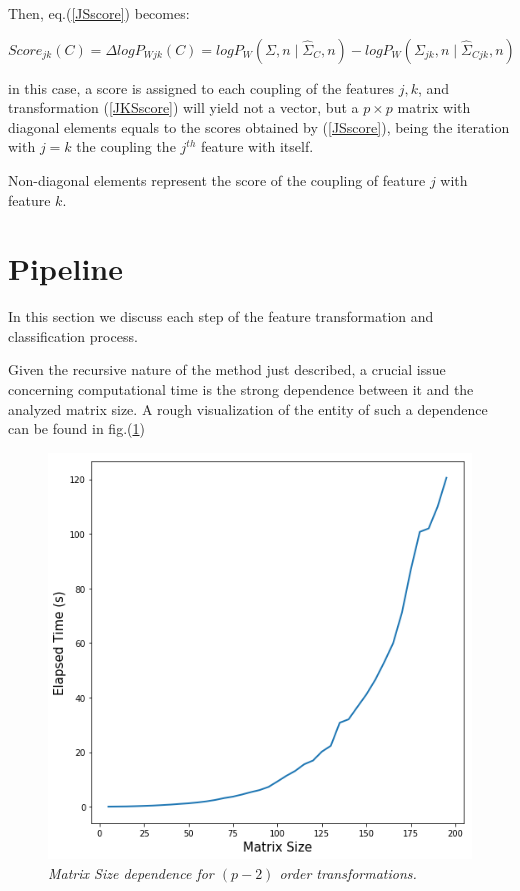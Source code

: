 \documentclass[12pt,openright,twoside,a4paper]{book}
\begin{document}
Then, eq.(\ref{JSscore}) becomes:

\begin{equation}
Score_{jk}(C)=\Delta logP_{Wjk}(C)=logP_W(\Sigma, n \mid \hat{\Sigma}_C,n)-logP_W(\Sigma_{jk}, n \mid \hat{\Sigma}_{Cjk},n)
\label{JKSscore}
\end{equation}
\vspace{5mm}

in this case, a score is assigned to each coupling of the features $j,k$, and transformation (\ref{JKSscore}) will yield not a vector, but a $p\times p$ matrix with diagonal elements equals to the scores obtained by (\ref{JSscore}), being the iteration with $j=k$ the coupling the $j^{th}$ feature with itself. 

Non-diagonal elements represent the score of the coupling of feature $j$ with feature $k$.

\section{Pipeline}

In this section we discuss each step of the feature transformation and classification process.

Given the recursive nature of the method just described, a crucial issue concerning computational time is the strong dependence between it and the analyzed matrix size.
A rough visualization of the entity of  such a dependence can be found in fig.(\ref{timevsize})

\begin{figure}[!h]
\centering
\includegraphics[scale=0.42]{RC2-timeVsize}
\caption{\textit{Matrix Size dependence for $(p-2)$ order transformations.}}
\label{timevsize}
\end{figure}
\end{document}
